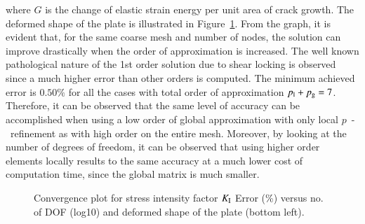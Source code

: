 \documentclass[review]{elsarticle}
\numberwithin{equation}{section}
\begin{document}
where $G$ is the change of elastic strain energy per unit area of crack growth.
The deformed shape of the plate is illustrated in Figure~\ref{fig:plate_conv_no_sing}.
From the graph, it is evident that, for the same coarse mesh and number of nodes, the solution can improve drastically when the order of approximation is increased. 
The well known pathological nature of the 1st order solution due to shear locking is observed since a much higher error than other orders is computed. 
The minimum achieved error is $0.50\%$ for all the cases with total order of approximation  $p_{\rm l} + p_{\rm g} = 7$. 
Therefore, it can be observed that the same level of accuracy can be accomplished when using a low order of global approximation with only local $p$~-~refinement as with high order on the entire mesh. 
Moreover, by looking at the number of degrees of freedom, it can be observed that using higher order elements locally results to the same accuracy at a much lower cost of computation time, since the global matrix is much smaller.
\begin{figure}
	\centering
	\caption{Convergence plot for stress intensity factor $K_{\rm I}$ Error (\%) versus no. of DOF (log10) and deformed shape of the plate (bottom left).}
	\label{fig:plate_conv_no_sing}
\end{figure}
\end{document}
